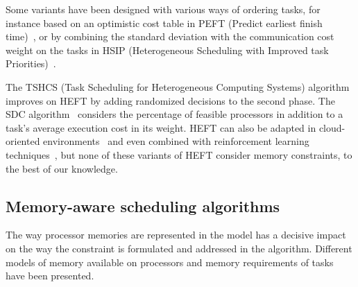 \documentclass[conference]{IEEEtran}
\begin{document}
Some variants have been designed with various ways of ordering tasks, for instance based
on an optimistic cost table in 
PEFT (Predict earliest finish time)~\cite{arabnejad2014list}, or by combining the standard deviation
with the communication cost weight on the tasks in HSIP (Heterogeneous Scheduling with Improved task Priorities)~\cite{wang2016hsip}. 
%

The TSHCS (Task Scheduling for Heterogeneous Computing Systems) algorithm~\cite{alebrahim2017task} 
improves on HEFT by adding randomized decisions to the second phase.
The SDC algorithm~\cite{SHI2006665} considers the percentage of feasible processors in addition to a task’s
average execution cost in its weight.
HEFT  can also be adapted in cloud-oriented environments~\cite{samadi2018eheft} and even combined with reinforcement learning techniques~\cite{yano2022cqga}, but none of these variants of HEFT consider memory constraints, 
to the best of our knowledge. 

\subsection{
Memory-aware scheduling algorithms}
%
The way processor memories are represented in the model has a decisive impact on the way the constraint
is formulated and addressed in the algorithm.
%
Different models of memory available on processors and memory requirements of tasks have been presented.
\end{document}
